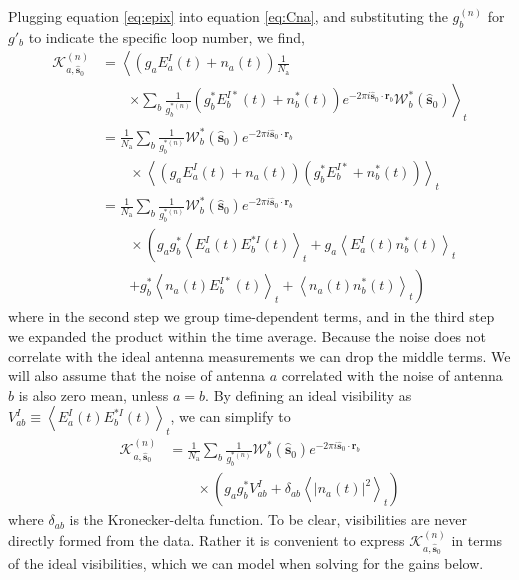 \documentclass[a4paper,fleqn,usenatbib]{mnras}
\newcommand{\Nant}{\ensuremath{N_{\mathrm{a}}}}
\newcommand{\spix}{\ensuremath{\hat{\mathbf{s}}_{0}}}
\newcommand{\Kna}[1][n]{\ensuremath{\mathcal{K}^{(#1)}_{a,\spix}}}
\newcommand{\rb}{\ensuremath{\mathbf{r}_b}}
\begin{document}
Plugging equation \ref{eq:epix} into equation \ref{eq:Cna}, 
and substituting the $g^{(n)}_b$ for $g'_b$ to indicate the specific loop number,
we find,
\begin{align}
\Kna & = \left<\left(g_a E_a^I(t)+n_a(t)\right) \frac{1}{\Nant} \right. \nonumber \\
& \qquad \left. \times \sum_b \frac{1}{g^{*(n)}_b}\left(g^*_bE_b^{I*}(t)+n^*_b(t)\right) e^{-2\pi i \spix \cdot \rb} \mathcal{W}^*_b(\spix)\right>_t \nonumber \\
& = \frac{1}{\Nant} \sum_b \frac{1}{g^{*(n)}_b} \mathcal{W}^*_b(\spix) e^{-2\pi i \spix \cdot \rb} \nonumber \\
& \qquad \times \left<\left(g_aE_a^I(t)+n_a(t)\right)\left(g^*_bE_b^{I*}+n^*_b(t)\right) \right>_t \nonumber \\
& = \frac{1}{\Nant} \sum_b \frac{1}{g^{*(n)}_b} \mathcal{W}^*_b(\spix) e^{-2\pi i \spix \cdot \rb} \nonumber \\
& \qquad \times \left(g_a g^*_b \left<E^I_a(t)E^{*I}_b(t)\right>_t + g_a\left<E_a^I(t)n^*_b(t)\right>_t \right. \nonumber \\
& \qquad \left. + g^*_b\left<n_a(t)E^{I*}_b(t)\right>_t + \left<n_a(t) n^*_b(t)\right>_t\right)  
\end{align}
where in the second step we group time-dependent terms, 
and in the third step we expanded the product within the time average.
Because the noise does not correlate with the ideal antenna measurements we can
drop the middle terms. We will also assume that the noise of antenna $a$ correlated with
the noise of antenna $b$ is also zero mean, unless $a=b$. By defining an ideal visibility as
$V_{ab}^I \equiv \left<E^I_a(t)E^{*I}_b(t)\right>_t$, we can simplify to
\begin{align}\label{eq:Kna}
\Kna & = \frac{1}{\Nant} \sum_b \frac{1}{g^{*(n)}_b} \mathcal{W}^*_b(\spix) e^{-2\pi i \spix \cdot \rb}\nonumber \\
& \qquad \times \left( g_ag_b^* V_{ab}^I + \delta_{ab}\left<|n_a(t)|^2\right>_t\right)
\end{align}
where $\delta_{ab}$ is the Kronecker-delta function. To be clear, visibilities are never directly 
formed from the data. Rather it is convenient to express $\Kna$ in terms of the ideal 
visibilities, which we can model when solving for the gains below.
\end{document}
